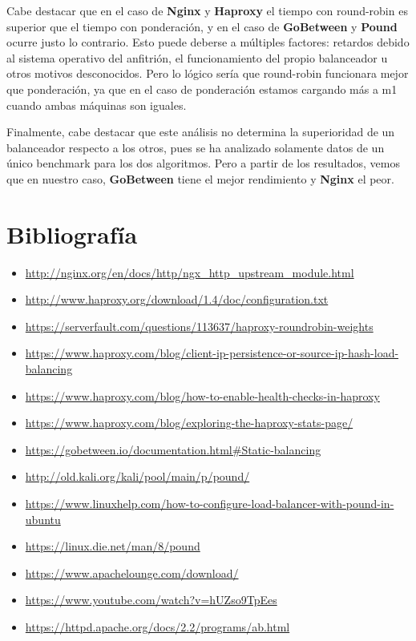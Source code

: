 \documentclass[twoside]{article}
\begin{document}
Cabe destacar que en el caso de \textbf{Nginx} y \textbf{Haproxy} el tiempo con round-robin es superior que el tiempo con ponderación, y en el caso de \textbf{GoBetween} y \textbf{Pound} ocurre justo lo contrario. Esto puede deberse a múltiples factores: retardos debido al sistema operativo del anfitrión, el funcionamiento del propio balanceador u otros motivos desconocidos. Pero lo lógico sería que round-robin funcionara mejor que ponderación, ya que en el caso de ponderación estamos cargando más a m1 cuando ambas máquinas son iguales.

Finalmente, cabe destacar que este análisis no determina la superioridad de un balanceador respecto a los otros, pues se ha analizado solamente datos de un único benchmark para los dos algoritmos. Pero a partir de los resultados, vemos que en nuestro caso, \textbf{GoBetween} tiene el mejor rendimiento y \textbf{Nginx} el peor.



\newpage
\section{Bibliografía}
\begin{itemize}
    \item \url{http://nginx.org/en/docs/http/ngx_http_upstream_module.html}
    \item \url{http://www.haproxy.org/download/1.4/doc/configuration.txt}
    \item \url{https://serverfault.com/questions/113637/haproxy-roundrobin-weights}
    \item \url{https://www.haproxy.com/blog/client-ip-persistence-or-source-ip-hash-load-balancing}
    \item \url{https://www.haproxy.com/blog/how-to-enable-health-checks-in-haproxy}
    \item \url{https://www.haproxy.com/blog/exploring-the-haproxy-stats-page/}
    \item \url{https://gobetween.io/documentation.html#Static-balancing}
    \item \url{http://old.kali.org/kali/pool/main/p/pound/}
    \item \url{https://www.linuxhelp.com/how-to-configure-load-balancer-with-pound-in-ubuntu}
    \item \url{https://linux.die.net/man/8/pound}
    \item \url{https://www.apachelounge.com/download/}
    \item \url{https://www.youtube.com/watch?v=hUZso9TpEes}
    \item \url{https://httpd.apache.org/docs/2.2/programs/ab.html}
\end{itemize}
\end{document}
